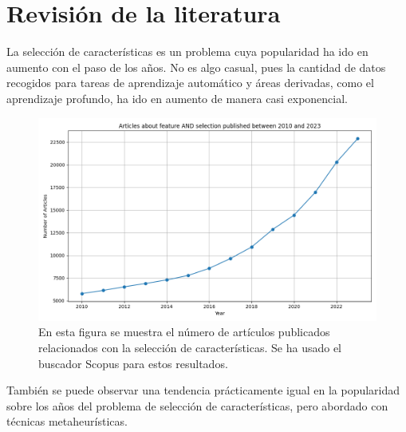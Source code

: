 \chapter{Revisión de la literatura}
La selección de características es un problema cuya popularidad ha ido en aumento con el paso de los años. No es algo casual, pues la cantidad de datos recogidos para tareas de aprendizaje automático y áreas derivadas, como el aprendizaje profundo, ha ido en aumento de manera casi exponencial.

\begin{figure}[H]
    \begin{center}
        \includegraphics[width=1\textwidth]{imagenes/scopus_chart.png}
    \end{center}
    \caption[Popularidad de feature selection sobre los años]{En esta figura se muestra el número de artículos publicados relacionados con la selección de características. Se ha usado el buscador Scopus para estos resultados.}
    \label{fig:pop_fs}
\end{figure}

También se puede observar una tendencia  prácticamente igual en la popularidad sobre los años del problema de selección de características, pero abordado con técnicas metaheurísticas.

